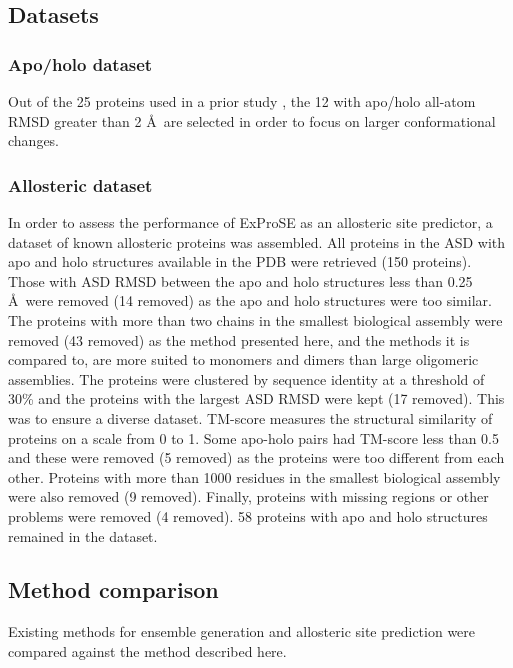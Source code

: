 \subsection{Datasets}

\subsubsection{Apo/holo dataset}

Out of the 25 proteins used in a prior study \cite{Atilgan2010}, the 12 with apo/holo all-atom RMSD greater than 2 \AA\ are selected in order to focus on larger conformational changes.


\subsubsection{Allosteric dataset}

In order to assess the performance of ExProSE as an allosteric site predictor, a dataset of known allosteric proteins was assembled.
All proteins in the ASD with apo and holo structures available in the PDB were retrieved (150 proteins).
Those with ASD RMSD between the apo and holo structures less than 0.25 \AA\ were removed (14 removed) as the apo and holo structures were too similar.
The proteins with more than two chains in the smallest biological assembly were removed (43 removed) as the method presented here, and the methods it is compared to, are more suited to monomers and dimers than large oligomeric assemblies.
The proteins were clustered by sequence identity at a threshold of 30\% and the proteins with the largest ASD RMSD were kept (17 removed).
This was to ensure a diverse dataset.
TM-score measures the structural similarity of proteins on a scale from 0 to 1.
Some apo-holo pairs had TM-score less than 0.5 and these were removed (5 removed) as the proteins were too different from each other.
Proteins with more than 1000 residues in the smallest biological assembly were also removed (9 removed).
Finally, proteins with missing regions or other problems were removed (4 removed).
58 proteins with apo and holo structures remained in the dataset.


\subsection{Method comparison}

Existing methods for ensemble generation and allosteric site prediction were compared against the method described here.


